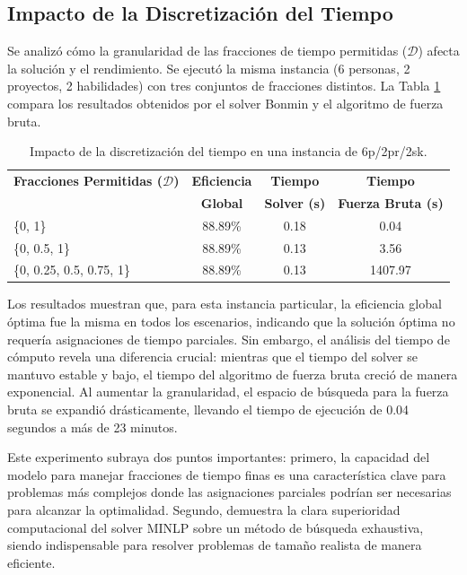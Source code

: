 \documentclass[conference]{IEEEtran}
\begin{document}
\subsection{Impacto de la Discretización del Tiempo}
Se analizó cómo la granularidad de las fracciones de tiempo permitidas (\(\mathcal{D}\)) afecta la solución y el rendimiento. Se ejecutó la misma instancia (6 personas, 2 proyectos, 2 habilidades) con tres conjuntos de fracciones distintos. La Tabla \ref{tab:discretizacion} compara los resultados obtenidos por el solver Bonmin y el algoritmo de fuerza bruta.

\begin{table}[htbp]
    \centering
    \caption{Impacto de la discretización del tiempo en una instancia de 6p/2pr/2sk.}
    \label{tab:discretizacion}
    \begin{tabularx}{\linewidth}{@{}lccc@{}}
        \toprule
        \textbf{Fracciones Permitidas (\(\mathcal{D}\))} & \textbf{Eficiencia} & \textbf{Tiempo}     & \textbf{Tiempo}           \\
                                                         & \textbf{Global}     & \textbf{Solver (s)} & \textbf{Fuerza Bruta (s)} \\
        \midrule
        \{0, 1\}                                         & 88.89\%             & 0.18                & 0.04                      \\
        \{0, 0.5, 1\}                                    & 88.89\%             & 0.13                & 3.56                      \\
        \{0, 0.25, 0.5, 0.75, 1\}                        & 88.89\%             & 0.13                & 1407.97                   \\
        \bottomrule
    \end{tabularx}
\end{table}

Los resultados muestran que, para esta instancia particular, la eficiencia global óptima fue la misma en todos los escenarios, indicando que la solución óptima no requería asignaciones de tiempo parciales. Sin embargo, el análisis del tiempo de cómputo revela una diferencia crucial: mientras que el tiempo del solver se mantuvo estable y bajo, el tiempo del algoritmo de fuerza bruta creció de manera exponencial. Al aumentar la granularidad, el espacio de búsqueda para la fuerza bruta se expandió drásticamente, llevando el tiempo de ejecución de 0.04 segundos a más de 23 minutos.

Este experimento subraya dos puntos importantes: primero, la capacidad del modelo para manejar fracciones de tiempo finas es una característica clave para problemas más complejos donde las asignaciones parciales podrían ser necesarias para alcanzar la optimalidad. Segundo, demuestra la clara superioridad computacional del solver MINLP sobre un método de búsqueda exhaustiva, siendo indispensable para resolver problemas de tamaño realista de manera eficiente.
\end{document}
